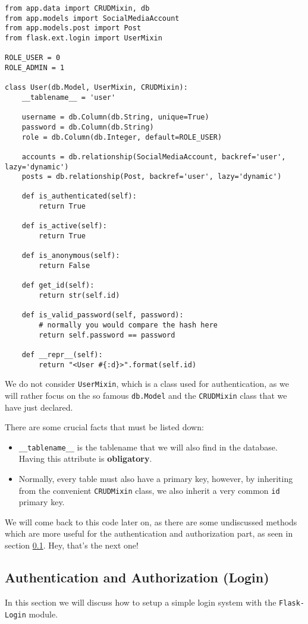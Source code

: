 \documentclass[../main/main.tex]{subfiles}
\begin{document}
\begin{lstlisting}
from app.data import CRUDMixin, db
from app.models import SocialMediaAccount
from app.models.post import Post
from flask.ext.login import UserMixin

ROLE_USER = 0
ROLE_ADMIN = 1

class User(db.Model, UserMixin, CRUDMixin):
    __tablename__ = 'user'

    username = db.Column(db.String, unique=True)
    password = db.Column(db.String)
    role = db.Column(db.Integer, default=ROLE_USER)

    accounts = db.relationship(SocialMediaAccount, backref='user', lazy='dynamic')
    posts = db.relationship(Post, backref='user', lazy='dynamic')

    def is_authenticated(self):
        return True

    def is_active(self):
        return True

    def is_anonymous(self):
        return False

    def get_id(self):
        return str(self.id)

    def is_valid_password(self, password):
        # normally you would compare the hash here
        return self.password == password

    def __repr__(self):
        return "<User #{:d}>".format(self.id)
\end{lstlisting}

We do not consider \lstinline|UserMixin|, which is a class used for
authentication, as we will rather focus on the so famous
\lstinline|db.Model| and the \lstinline|CRUDMixin| class that we have
just declared.

There are some crucial facts that must be listed down: 
\begin{itemize}
  \item \lstinline|__tablename__| is the tablename that we will also
    find in the database. Having this attribute is
    \textbf{obligatory}. 
  \item Normally, every table must also have a primary key, however,
    by inheriting from the convenient \lstinline|CRUDMixin| class, we
    also inherit a very common \lstinline|id| primary key. 
\end{itemize}

We will come back to this code later on, as there are some undiscussed
methods which are more useful for the authentication and authorization
part, as seen in section \ref{sec:auth}. Hey, that's the next one!

\subsection{Authentication and Authorization (Login)}
\label{sec:auth}

In this section we will discuss how to setup a simple login system
with the \lstinline|Flask-Login| module. 

% 
\end{document}
